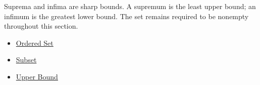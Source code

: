 \begin{remark*}[Exposition]
Suprema and infima are sharp bounds.  A supremum is the least upper
bound; an infimum is the greatest lower bound.  The set remains required
to be nonempty throughout this section.
\end{remark*}

\begin{dependencies}
\begin{itemize}
  \item \hyperref[def:ordered-set]{Ordered Set}
  \item \hyperref[def:subset]{Subset}
  \item \hyperref[def:real-upper-bound]{Upper Bound}
\end{itemize}
\end{dependencies}
